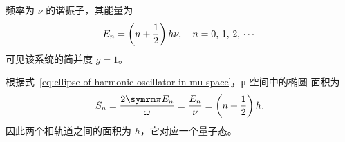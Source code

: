 \begin{example}[一维谐振子]
  频率为 $\nu$ 的谐振子，其能量为
  \begin{equation}
    E_n = \qty(n+\frac{1}{2}) \, h\nu \qc n = 0, \, 1, \, 2, \, \cdots
  \end{equation}
  可见该系统的简并度 $g=1$。

  根据式~\eqref{eq:ellipse-of-harmonic-oscillator-in-mu-space}，μ 空间中的椭圆
  面积为
  \begin{equation}
    S_n = \frac{2\pp E_n}{\omega} =\frac{E_n}{\nu} = \qty(n+\frac{1}{2}) \, h.
  \end{equation}
  因此两个相轨道之间的面积为 $h$，它对应一个量子态。
\end{example}

    

